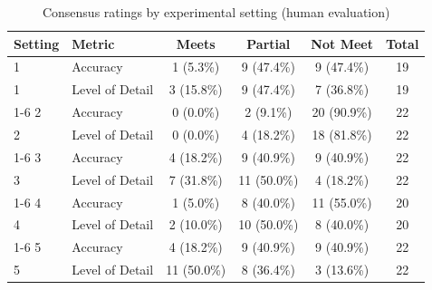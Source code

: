
\begin{table}[ht]
\centering
\caption{Consensus ratings by experimental setting (human evaluation)}
\label{tab:consensus_by_setting}
\begin{tabular}{llcccc}
\toprule
\textbf{Setting} & \textbf{Metric} & \textbf{Meets} & \textbf{Partial} & \textbf{Not Meet} & \textbf{Total} \\
\midrule
1 & Accuracy & 1 (5.3\%) & 9 (47.4\%) & 9 (47.4\%) & 19 \\
1 & Level of Detail & 3 (15.8\%) & 9 (47.4\%) & 7 (36.8\%) & 19 \\
\cmidrule{1-6}
2 & Accuracy & 0 (0.0\%) & 2 (9.1\%) & 20 (90.9\%) & 22 \\
2 & Level of Detail & 0 (0.0\%) & 4 (18.2\%) & 18 (81.8\%) & 22 \\
\cmidrule{1-6}
3 & Accuracy & 4 (18.2\%) & 9 (40.9\%) & 9 (40.9\%) & 22 \\
3 & Level of Detail & 7 (31.8\%) & 11 (50.0\%) & 4 (18.2\%) & 22 \\
\cmidrule{1-6}
4 & Accuracy & 1 (5.0\%) & 8 (40.0\%) & 11 (55.0\%) & 20 \\
4 & Level of Detail & 2 (10.0\%) & 10 (50.0\%) & 8 (40.0\%) & 20 \\
\cmidrule{1-6}
5 & Accuracy & 4 (18.2\%) & 9 (40.9\%) & 9 (40.9\%) & 22 \\
5 & Level of Detail & 11 (50.0\%) & 8 (36.4\%) & 3 (13.6\%) & 22 \\
\bottomrule
\end{tabular}
\end{table}
